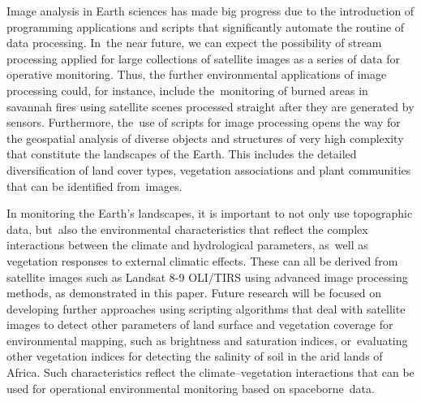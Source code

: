 \documentclass[jimaging,article,accept,pdftex,moreauthors]{Definitions/mdpi}
\begin{document}
Image analysis in Earth sciences has made big progress due to the introduction of programming applications and scripts that significantly automate the routine of data processing. In~the near future, we can expect the possibility of stream processing applied for large collections of satellite images as a series of data for operative monitoring. Thus, the further environmental applications of image processing could, for instance, include the~monitoring of burned areas in savannah fires using satellite scenes processed straight after they are generated by sensors. Furthermore, the~use of scripts for image processing opens the way for the geospatial analysis of diverse objects and structures of very high complexity that constitute the landscapes of the Earth. This includes the detailed diversification of land cover types, vegetation associations and plant communities that can be identified from~images.

In monitoring the Earth's landscapes, it is important to not only use topographic data, but~also the environmental characteristics that reflect the complex interactions between the climate and hydrological parameters, as~well as vegetation responses to external climatic effects. These can all be derived from  satellite images such as Landsat 8-9 OLI/TIRS using advanced image processing methods, as demonstrated in this paper. Future research will be focused on developing further approaches using scripting algorithms that deal with satellite images to detect other parameters of land surface and vegetation coverage for environmental mapping, such as brightness and saturation indices, or~evaluating other vegetation indices for detecting the salinity of soil in the arid lands of Africa. Such characteristics reflect the climate--vegetation interactions that can be used for operational environmental monitoring based on spaceborne~data.  



\vspace{12pt}

\end{document}

